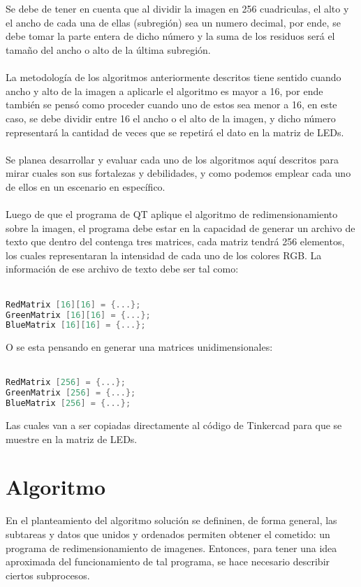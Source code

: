 \documentclass{article}
\begin{document}
\\
\\
Se debe de tener en cuenta que al dividir la imagen en 256 cuadriculas, el alto y el ancho de cada una de ellas (subregión) sea un numero decimal, por ende, se debe tomar la parte entera de dicho número y la suma de los residuos será el tamaño del ancho o alto de la última subregión.
\\
\\
La metodología de los algoritmos anteriormente descritos tiene sentido cuando ancho y alto de la imagen a aplicarle el algoritmo es mayor a 16, por ende también se pensó como proceder cuando uno de estos sea menor a 16, en este caso, se debe dividir entre 16 el ancho o el alto de la imagen, y dicho número representará la cantidad de veces que se repetirá el dato en la matriz de LEDs.
\\
\\
Se planea desarrollar y evaluar cada uno de los algoritmos aquí descritos para mirar cuales son sus fortalezas y debilidades, y como podemos emplear cada uno de ellos en un escenario en específico.
\\
\\
Luego de que el programa de QT aplique el algoritmo de redimensionamiento sobre la imagen, el programa debe estar en la capacidad de generar un archivo de texto que dentro del contenga tres matrices, cada matriz tendrá 256 elementos, los cuales representaran la intensidad de cada uno de los colores RGB. La información de ese archivo de texto debe ser tal como:
\\
\\
\begin{lstlisting}[language=C++, label=codigo_ejemplo]
RedMatrix [16][16] = {...};
GreenMatrix [16][16] = {...};
BlueMatrix [16][16] = {...};
\end{lstlisting}
O se esta pensando en generar una matrices unidimensionales:
\\
\\
\begin{lstlisting}[language=C++, label=codigo_ejemplo2]
RedMatrix [256] = {...};
GreenMatrix [256] = {...};
BlueMatrix [256] = {...};
\end{lstlisting}
Las cuales van a ser copiadas directamente al código de Tinkercad para que se muestre en la matriz de LEDs.

\section{Algoritmo} \label{algoritmo}
En el planteamiento del algoritmo solución se defininen, de forma general, las subtareas y datos que unidos y ordenados permiten obtener el cometido: un programa de redimensionamiento de imagenes. Entonces, para tener una idea aproximada del funcionamiento de tal programa, se hace necesario describir ciertos subprocesos. 
\end{document}
